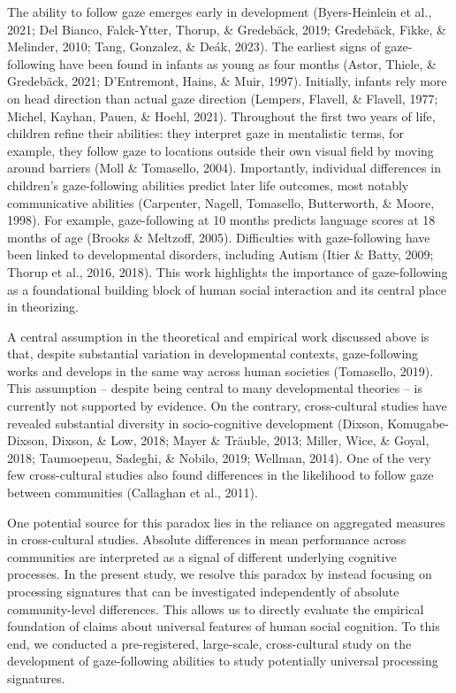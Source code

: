\documentclass[
  man,floatsintext]{apa6}
\begin{document}
The ability to follow gaze emerges early in development (Byers-Heinlein et al., 2021; Del Bianco, Falck-Ytter, Thorup, \& Gredebäck, 2019; Gredebäck, Fikke, \& Melinder, 2010; Tang, Gonzalez, \& Deák, 2023). The earliest signs of gaze-following have been found in infants as young as four months (Astor, Thiele, \& Gredebäck, 2021; D'Entremont, Hains, \& Muir, 1997). Initially, infants rely more on head direction than actual gaze direction (Lempers, Flavell, \& Flavell, 1977; Michel, Kayhan, Pauen, \& Hoehl, 2021). Throughout the first two years of life, children refine their abilities: they interpret gaze in mentalistic terms, for example, they follow gaze to locations outside their own visual field by moving around barriers (Moll \& Tomasello, 2004). Importantly, individual differences in children's gaze-following abilities predict later life outcomes, most notably communicative abilities (Carpenter, Nagell, Tomasello, Butterworth, \& Moore, 1998). For example, gaze-following at 10 months predicts language scores at 18 months of age (Brooks \& Meltzoff, 2005). Difficulties with gaze-following have been linked to developmental disorders, including Autism (Itier \& Batty, 2009; Thorup et al., 2016, 2018). This work highlights the importance of gaze-following as a foundational building block of human social interaction and its central place in theorizing.

A central assumption in the theoretical and empirical work discussed above is that, despite substantial variation in developmental contexts, gaze-following works and develops in the same way across human societies (Tomasello, 2019). This assumption -- despite being central to many developmental theories -- is currently not supported by evidence. On the contrary, cross-cultural studies have revealed substantial diversity in socio-cognitive development (Dixson, Komugabe-Dixson, Dixson, \& Low, 2018; Mayer \& Träuble, 2013; Miller, Wice, \& Goyal, 2018; Taumoepeau, Sadeghi, \& Nobilo, 2019; Wellman, 2014). One of the very few cross-cultural studies also found differences in the likelihood to follow gaze between communities (Callaghan et al., 2011).

One potential source for this paradox lies in the reliance on aggregated measures in cross-cultural studies. Absolute differences in mean performance across communities are interpreted as a signal of different underlying cognitive processes. In the present study, we resolve this paradox by instead focusing on processing signatures that can be investigated independently of absolute community-level differences. This allows us to directly evaluate the empirical foundation of claims about universal features of human social cognition. To this end, we conducted a pre-registered, large-scale, cross-cultural study on the development of gaze-following abilities to study potentially universal processing signatures.
\end{document}
